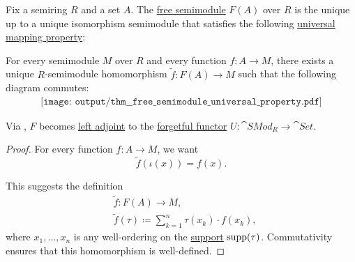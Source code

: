 \begin{proposition}\label{thm:free_semimodule_universal_property}
  Fix a semiring \( R \) and a set \( A \). The \hyperref[def:free_semimodule]{free semimodule} \( F(A) \) over \( R \) is the unique up to a unique isomorphism semimodule that satisfies the following \hyperref[rem:universal_mapping_property]{universal mapping property}:
  \begin{displayquote}
    For every semimodule \( M \) over \( R \) and every function \( f: A \to M \), there exists a unique \( R \)-semimodule homomorphism \( \widetilde{f}: F(A) \to M \) such that the following diagram commutes:
    \begin{equation}\label{eq:thm:free_semimodule_universal_property/diagram}
      \begin{aligned}
        \texttt{[image: output/thm\_\_free\_semimodule\_universal\_property.pdf]}
      \end{aligned}
    \end{equation}
  \end{displayquote}

  Via , \( F \) becomes \hyperref[def:category_adjunction]{left adjoint} to the \hyperref[def:concrete_category]{forgetful functor} \( U: \cat{SMod}_R \to \cat{Set} \).
\end{proposition}
\begin{proof}
  For every function \( f: A \to M \), we want
  \begin{equation*}
    \widetilde{f}(\iota(x)) = f(x).
  \end{equation*}

  This suggests the definition
  \begin{equation*}
    \begin{aligned}
      &\widetilde{f}: F(A) \to M, \\
      &\widetilde{f}(\tau) \coloneqq \sum_{k=1}^n \tau(x_k) \cdot f(x_k),
    \end{aligned}
  \end{equation*}
  where \( x_1, \ldots, x_n \) is any well-ordering on the \hyperref[def:function_support]{support} \( \operatorname{supp}(\tau) \). Commutativity ensures that this homomorphism is well-defined.
\end{proof}
